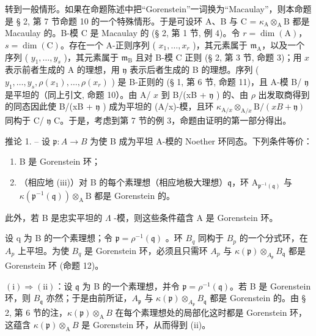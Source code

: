 转到一般情形。如果在命题陈述中把“Gorenstein”一词换为“Macaulay”，则本命题是 § 2, 第 7 节命题 10 的一个特殊情形。于是可设环 A、B 与 C = \(\kappa_{\mathrm{A}} \otimes_{\mathrm{A}} \mathrm{B}\) 都是 Macaulay 的。B-模 C 是 Macaulay 的 (§ 2, 第 1 节, 例 4)。令 \(r = \dim(\mathrm{A})\)，\(s = \dim(\mathrm{C})\)。存在一个 A-正则序列 ( \(x_1, \ldots, x_r\) )，其元素属于 \(\mathfrak{m}_{\mathrm{A}}\)，以及一个序列 ( \(y_1, \ldots, y_s\) )，其元素属于 \(\mathfrak{m}_{\mathrm{B}}\) 且对 B-模 C 正则 (§ 2, 第 3 节, 命题 3)；用 \(x\) 表示前者生成的 A 的理想，用 \(\mathfrak{y}\) 表示后者生成的 B 的理想。序列 ( \(y_1, \ldots, y_s, \rho(x_1), \ldots, \rho(x_r)\) ) 是 B-正则的 (§ 1, 第 6 节, 命题 11)，且 A-模 B/ \(\mathfrak{y}\) 是平坦的（同上引文, 命题 10）。由 A/ \(x\) 到 B/(xB + \(\mathfrak{y}\) ) 的、由 \(\rho\) 出发取商得到的同态因此使 B/(xB + \(\mathfrak{y}\) ) 成为平坦的 (A/x)-模，且环 \(\kappa_{\mathrm{A}/x} \otimes_{\mathrm{A}/x} \mathrm{B}/(xB + \mathfrak{y})\) 同构于 C/ \(\mathfrak{y}\) C。于是，考虑到第 7 节的例 3，命题由证明的第一部分得出。

推论 1. -- 设 \(\mathfrak{p}: A \to B\) 为使 B 成为平坦 A-模的 Noether 环同态。下列条件等价：

\begin{enumerate}
\def\labelenumi{(\roman{enumi})}
\item
  B 是 Gorenstein 环；
\item
  （相应地 (iii)）对 B 的每个素理想（相应地极大理想）\(\mathfrak{q}\)，环 \(\mathrm{A}_{\mathfrak{p}^{-1}(\mathfrak{q})}\) 与 \(\kappa (\mathfrak{p}^{-1}(\mathfrak{q}))\otimes_{\mathrm{A}}\mathrm{B}\) 都是 Gorenstein 的。
\end{enumerate}

此外，若 B 是忠实平坦的 \(\Lambda\) -模，则这些条件蕴含 A 是 Gorenstein 环。

设 q 为 B 的一个素理想；令 \(\mathfrak{p} = \rho^{-1}(\mathfrak{q})\) 。环 \(B_{q}\) 同构于 \(B_{p}\) 的一个分式环，在 \(A_{p}\) 上平坦。为使 \(B_{q}\) 是 Gorenstein 环，必须且只需环 \(A_{p}\) 与 \(\kappa(\mathfrak{p}) \otimes_{A_{\mathfrak{p}}} B_{\mathfrak{q}}\) 都是 Gorenstein 环 (命题 12)。

\((\mathrm{i}) \Rightarrow (\mathrm{ii})\)：设 \(\mathfrak{q}\) 为 B 的一个素理想，并令 \(\mathfrak{p} = \rho^{-1}(\mathfrak{q})\)。若 B 是 Gorenstein 环，则 \(B_{\mathfrak{q}}\) 亦然；于是由前所证，\(A_{\mathfrak{p}}\) 与 \(\kappa(\mathfrak{p}) \otimes_{A_{\mathfrak{p}}} B_{\mathfrak{q}}\) 都是 Gorenstein 的。由 § 2, 第 6 节的注，\(\kappa(\mathfrak{p}) \otimes_{\mathrm{A}} B\) 在每个素理想处的局部化这时都是 Gorenstein 环，这蕴含 \(\kappa(\mathfrak{p}) \otimes_{\mathrm{A}} B\) 是 Gorenstein 环，从而得到 (ii)。

